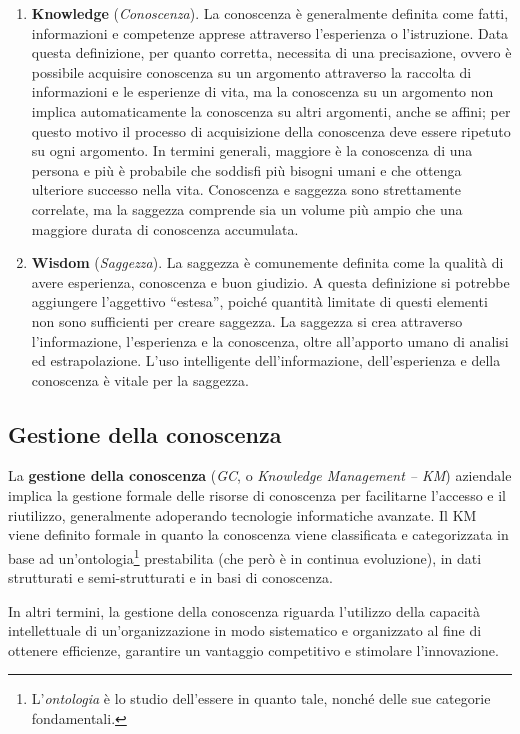 \begin{enumerate}
    \item \textbf{Knowledge} (\textit{Conoscenza}). La conoscenza è generalmente definita come fatti, informazioni e competenze apprese attraverso l'esperienza o l'istruzione. Data questa definizione, per quanto corretta, necessita di una precisazione, ovvero è possibile acquisire conoscenza su un argomento attraverso la raccolta di informazioni e le esperienze di vita, ma la conoscenza su un argomento non implica automaticamente la conoscenza su altri argomenti, anche se affini; per questo motivo il processo di acquisizione della conoscenza deve essere ripetuto su ogni argomento. In termini generali, maggiore è la conoscenza di una persona e più è probabile che soddisfi più bisogni umani e che ottenga ulteriore successo nella vita. Conoscenza e saggezza sono strettamente correlate, ma la saggezza comprende sia un volume più ampio che una maggiore durata di conoscenza accumulata.
    \item \textbf{Wisdom} (\textit{Saggezza}). La saggezza è comunemente definita come la qualità di avere esperienza, conoscenza e buon giudizio. A questa definizione si potrebbe aggiungere l'aggettivo “estesa”, poiché quantità limitate di questi elementi non sono sufficienti per creare saggezza. La saggezza si crea attraverso l'informazione, l'esperienza e la conoscenza, oltre all'apporto umano di analisi ed estrapolazione. L'uso intelligente dell'informazione, dell'esperienza e della conoscenza è vitale per la saggezza.
\end{enumerate}

\subsection{Gestione della conoscenza}

La \textbf{gestione della conoscenza} (\textit{GC}, o \textit{Knowledge Management – KM}) aziendale implica la gestione formale delle risorse di conoscenza per facilitarne l'accesso e il riutilizzo, generalmente adoperando tecnologie informatiche avanzate. Il KM viene definito formale in quanto la conoscenza viene classificata e categorizzata in base ad un'ontologia\footnote{L'\textit{ontologia} è lo studio dell'essere in quanto tale, nonché delle sue categorie fondamentali.\cite{wikipedia_ontologia}} prestabilita (che però è in continua evoluzione), in dati strutturati e semi-strutturati e in basi di conoscenza.\cite{overview_of_knowledge_management}

In altri termini, la gestione della conoscenza riguarda l'utilizzo della capacità intellettuale di un'organizzazione in modo sistematico e organizzato al fine di ottenere efficienze, garantire un vantaggio competitivo e stimolare l'innovazione.\cite{ieee_enterprise_knowledge_management}

